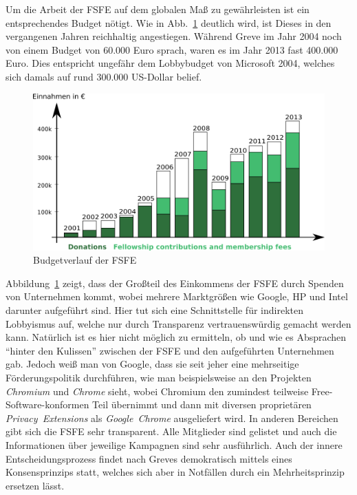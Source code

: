 Um die Arbeit der FSFE auf dem globalen Maß zu gewährleisten ist ein 
entsprechendes Budget nötigt. Wie in Abb.~\ref{fig:finances_image} deutlich 
wird, ist Dieses in den vergangenen Jahren reichhaltig angestiegen. Während 
Greve 
im Jahr 2004 noch von einem Budget von 60.000 Euro sprach, waren es im Jahr 
2013 fast 400.000 Euro. Dies entspricht ungefähr dem Lobbybudget von Microsoft 
2004, welches sich damals auf rund 300.000 US-Dollar 
belief.\cite{PLGreveInterView}
\begin{figure}[h]
    \includegraphics[width=\textwidth]{finanzen1}
    \centering
    \caption{Budgetverlauf der FSFE}
    \label{fig:finances_image}
\end{figure}
Abbildung~\ref{fig:finances_image} zeigt, dass der Großteil des Einkommens der 
FSFE durch Spenden von Unternehmen kommt, wobei mehrere Marktgrößen wie Google, 
HP und Intel darunter aufgeführt sind. Hier tut sich eine Schnittstelle für 
indirekten Lobbyismus auf, welche nur durch Transparenz vertrauenswürdig 
gemacht werden kann. Natürlich ist es hier nicht möglich zu ermitteln, ob und 
wie es Absprachen ``hinter den Kulissen'' zwischen der FSFE und den 
aufgeführten Unternehmen gab. Jedoch weiß man \zB von Google, dass sie seit 
jeher 
eine mehrseitige Förderungspolitik durchführen, wie man beispielsweise an den 
Projekten \emph{Chromium} und \emph{Chrome} sieht, wobei Chromium den zumindest 
teilweise Free-Software-konformen Teil übernimmt und dann mit diversen 
proprietären 
\emph{Privacy~Extensions} als \emph{Google~Chrome} ausgeliefert wird. In 
anderen Bereichen 
gibt sich die FSFE sehr transparent. Alle Mitglieder sind 
gelistet und auch die Informationen über jeweilige Kampagnen sind sehr 
ausführlich. Auch der innere Entscheidungsprozess findet nach Greves 
\cite{PLGreveInterView} demokratisch mittels eines Konsensprinzips statt, 
welches sich aber in Notfällen durch ein Mehrheitsprinzip ersetzen lässt.

